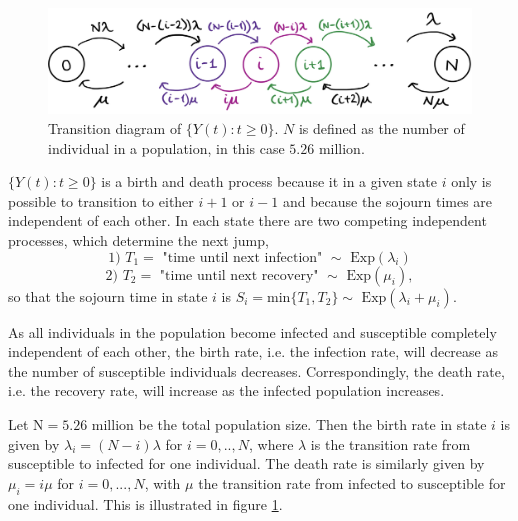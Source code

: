 \begin{figure}
    \centering
    \includegraphics[width=140mm]{1f_new.png}
    \caption{Transition diagram of $\{Y(t):t \geq 0 \}$. $N$ is defined as the number of individual in a population, in this case $5.26 \text{ million.}$}
    \label{transdiagramY}
\end{figure}
$\{Y(t):t \geq 0\}$ is a birth and death process because it in a given state $i$ only is possible to transition to either $i+1$ or $i-1$ and because the sojourn times are independent of each other. In each state there are two competing independent processes, which determine the next jump,
$$\text{1) } T_1  = \text{ "time until next infection" } \sim \text{ Exp}(\lambda_i)$$
$$\text{2) } T_2 = \text{ "time until next recovery" } \sim \text{ Exp}(\mu_i),$$
so that the sojourn time in state $i$ is $S_i = \text{min}\{T_1, T_2\} \sim \text{ Exp}(\lambda_i +\mu_i)$.

As all individuals in the population become infected and susceptible completely independent of each other, the birth rate, i.e. the infection rate, will decrease as the number of susceptible individuals decreases. Correspondingly, the death rate, i.e. the recovery rate, will increase as the infected population increases.

Let $\text{N}=5.26\text{ million}$ be the total population size. Then the birth rate in state $i$ is given by $\lambda_i=(N-i)\lambda$ for $i=0,..,N$, where $\lambda$ is the transition rate from susceptible to infected for one individual. The death rate is similarly given by $\mu_i = i\mu$ for $i=0,...,N$, with $\mu$ the transition rate from infected to susceptible for one individual. This is illustrated in figure \ref{transdiagramY}.

